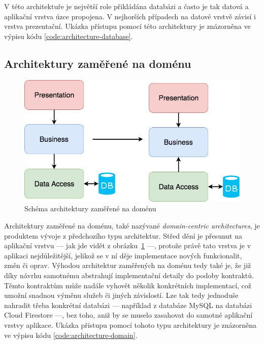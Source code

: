 V této architektuře je největší role přikládána databázi
a často je tak datová a aplikační vrstva úzce propojena.
V nejhorších případech na datové vrstvě závisí i vrstva prezentační.
\cite{architecture}
Ukázka přístupu pomocí této architektury je znázorněna ve výpisu kódu
\ref{code:architecture-database}.

\subsection{Architektury zaměřené na doménu}

\begin{figure}
    \centering
    \includegraphics[width=0.5\linewidth]{assets/technology-research/architecture/domain-centric.jpeg}
    \caption{Schéma architektury zaměřené na doménu ~\cite{architecture}}
    \label{fig:architecture_domain}
\end{figure}

Architektury zaměřené na doménu,
také nazývané \emph{domain-centric architectures},
je produktem vývoje z předchozího typu architektur.
Střed dění je přesunut na aplikační vrstvu
--- jak jde vidět z obrázku~\ref{fig:architecture_domain} ---,
protože právě tato vrstva je v aplikaci nejdůležitější,
jelikož se v ní děje implementace nových funkcionalit, změn či oprav.
\cite{architecture}
\cite[kapitola~15]{martin_clean_architecture}
Výhodou architektur zaměřených na doménu tedy také je,
že již díky návrhu samotnému abstrahují implementační detaily do podoby
kontraktů.
Těmto kontraktům může nadále vyhovět několik konkrétních implementací,
což umožní snadnou výměnu služeb či jiných závislostí.
\cite{martin_clean_architecture}
Lze tak tedy jednoduše nahradit třeba konkrétní databázi
--- například z databáze MySQL na databázi Cloud Firestore ---,
bez toho,
aniž by se muselo zasahovat do samotné aplikační vrstvy aplikace.
Ukázka přístupu pomocí tohoto typu architektury je znázorněna ve výpisu kódu
\ref{code:architecture-domain}.

